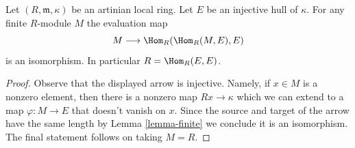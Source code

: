\begin{lemma}
\label{lemma-evaluate}
Let $(R, \mathfrak m, \kappa)$ be an artinian local ring.
Let $E$ be an injective hull of $\kappa$.
For any finite $R$-module $M$ the evaluation map
$$
M \longrightarrow \Hom_R(\Hom_R(M, E), E)
$$
is an isomorphism. In particular $R = \Hom_R(E, E)$.
\end{lemma}

\begin{proof}
Observe that the displayed arrow is injective. Namely, if $x \in M$ is
a nonzero element, then there is a nonzero map $Rx \to \kappa$ which
we can extend to a map $\varphi : M \to E$ that doesn't vanish on $x$.
Since the source and target of the arrow have the same length by
Lemma \ref{lemma-finite}
we conclude it is an isomorphism. The final statement follows
on taking $M = R$.
\end{proof}
